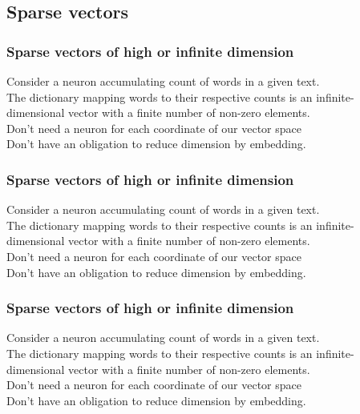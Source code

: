 \documentclass{beamer}
\newcommand{\msgray}[1]{{\color{mygray} #1}}
\begin{document}
\subsection{Sparse vectors}

\begin{frame}

  \frametitle{Sparse vectors of high or infinite dimension}

Consider a neuron accumulating count of words in a given text.\\[2ex]

\msgray{The dictionary mapping words to their respective counts is an infinite-dimensional vector
with a finite number of non-zero elements.\\[2ex]

Don't need a neuron for each coordinate of our vector space\\[2ex]

Don't have an obligation to reduce dimension by embedding.}

\end{frame}

\begin{frame}

  \frametitle{Sparse vectors of high or infinite dimension}

Consider a neuron accumulating count of words in a given text.\\[2ex]

The dictionary mapping words to their respective counts is an infinite-dimensional vector
with a finite number of non-zero elements.\\[2ex]

\msgray{Don't need a neuron for each coordinate of our vector space\\[2ex]

Don't have an obligation to reduce dimension by embedding.}

\end{frame}

\begin{frame}

  \frametitle{Sparse vectors of high or infinite dimension}

Consider a neuron accumulating count of words in a given text.\\[2ex]

The dictionary mapping words to their respective counts is an infinite-dimensional vector
with a finite number of non-zero elements.\\[2ex]

Don't need a neuron for each coordinate of our vector space\\[2ex]

\msgray{Don't have an obligation to reduce dimension by embedding.}

\end{frame}
\end{document}
